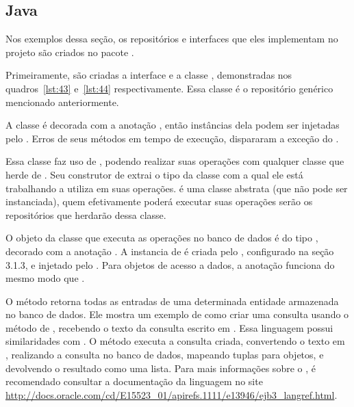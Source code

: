 \subsection{Java}

Nos exemplos dessa seção, os repositórios e interfaces que eles implementam no projeto  são criados no pacote .

Primeiramente, são criadas a interface  e a classe , demonstradas nos quadros~\ref{lst:43} e~\ref{lst:44} respectivamente. Essa classe é o repositório genérico mencionado anteriormente.



A classe  é decorada com a anotação , então instâncias dela podem ser injetadas pelo . Erros de seus métodos em tempo de execução, dispararam a exceção  do .

Essa classe faz uso de , podendo realizar suas operações com qualquer classe que herde de . Seu construtor de extrai o tipo da classe com a qual ele está trabalhando a utiliza em suas operações.  é uma classe abstrata (que não pode ser instanciada), quem efetivamente poderá executar suas operações serão os repositórios que herdarão dessa classe.

O objeto da classe que executa as operações no banco de dados é do tipo , decorado com a anotação . A instancia de  é criada pelo  , configurado na seção 3.1.3, e injetado pelo . Para objetos de acesso a dados, a anotação  funciona do mesmo modo que .

O método  retorna todas as entradas de uma determinada entidade armazenada no banco de dados. Ele mostra um exemplo de como criar uma consulta usando o método  de , recebendo o texto da consulta escrito em . Essa linguagem possui similaridades com . O método  executa a consulta criada, convertendo o texto  em , realizando a consulta no banco de dados, mapeando tuplas para objetos, e devolvendo o resultado como uma lista. Para mais informações sobre o , é recomendado consultar a documentação da linguagem no site \url{http://docs.oracle.com/cd/E15523_01/apirefs.1111/e13946/ejb3_langref.html}.

